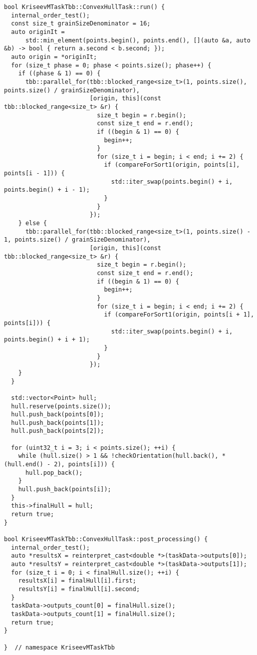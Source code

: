 \documentclass[a4paper,12pt]{article}
\begin{document}
\begin{lstlisting}
bool KriseevMTaskTbb::ConvexHullTask::run() {
  internal_order_test();
  const size_t grainSizeDenominator = 16;
  auto originIt =
      std::min_element(points.begin(), points.end(), [](auto &a, auto &b) -> bool { return a.second < b.second; });
  auto origin = *originIt;
  for (size_t phase = 0; phase < points.size(); phase++) {
    if ((phase & 1) == 0) {
      tbb::parallel_for(tbb::blocked_range<size_t>(1, points.size(), points.size() / grainSizeDenominator),
                        [origin, this](const tbb::blocked_range<size_t> &r) {
                          size_t begin = r.begin();
                          const size_t end = r.end();
                          if ((begin & 1) == 0) {
                            begin++;
                          }
                          for (size_t i = begin; i < end; i += 2) {
                            if (compareForSort1(origin, points[i], points[i - 1])) {
                              std::iter_swap(points.begin() + i, points.begin() + i - 1);
                            }
                          }
                        });
    } else {
      tbb::parallel_for(tbb::blocked_range<size_t>(1, points.size() - 1, points.size() / grainSizeDenominator),
                        [origin, this](const tbb::blocked_range<size_t> &r) {
                          size_t begin = r.begin();
                          const size_t end = r.end();
                          if ((begin & 1) == 0) {
                            begin++;
                          }
                          for (size_t i = begin; i < end; i += 2) {
                            if (compareForSort1(origin, points[i + 1], points[i])) {
                              std::iter_swap(points.begin() + i, points.begin() + i + 1);
                            }
                          }
                        });
    }
  }

  std::vector<Point> hull;
  hull.reserve(points.size());
  hull.push_back(points[0]);
  hull.push_back(points[1]);
  hull.push_back(points[2]);

  for (uint32_t i = 3; i < points.size(); ++i) {
    while (hull.size() > 1 && !checkOrientation(hull.back(), *(hull.end() - 2), points[i])) {
      hull.pop_back();
    }
    hull.push_back(points[i]);
  }
  this->finalHull = hull;
  return true;
}

bool KriseevMTaskTbb::ConvexHullTask::post_processing() {
  internal_order_test();
  auto *resultsX = reinterpret_cast<double *>(taskData->outputs[0]);
  auto *resultsY = reinterpret_cast<double *>(taskData->outputs[1]);
  for (size_t i = 0; i < finalHull.size(); ++i) {
    resultsX[i] = finalHull[i].first;
    resultsY[i] = finalHull[i].second;
  }
  taskData->outputs_count[0] = finalHull.size();
  taskData->outputs_count[1] = finalHull.size();
  return true;
}

}  // namespace KriseevMTaskTbb
\end{lstlisting}
\end{document}
